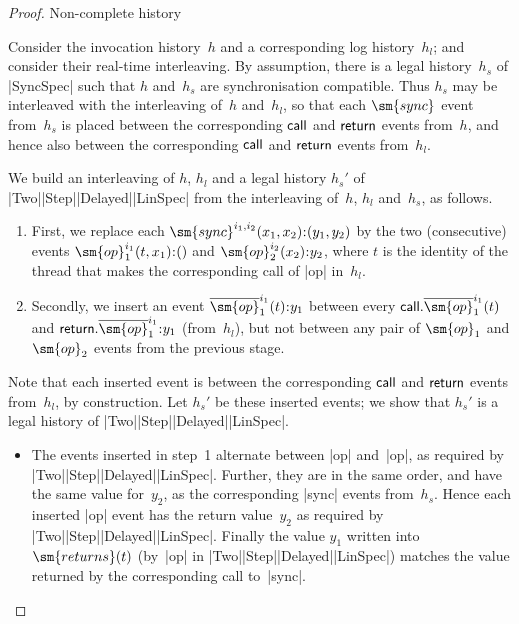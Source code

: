 \begin{proof}
\framebox{**} Non-complete history

Consider the invocation history~$h$ and a corresponding log history~$h_l$; and
consider their real-time interleaving.  By assumption, there is a legal
history~$h_s$ of |SyncSpec| such that $h$ and~$h_s$ are synchronisation
compatible.  Thus $h_s$ may be interleaved with the interleaving of~$h$
and~$h_l$, so that each $\sm{sync}$ event from~$h_s$ is placed between the
corresponding $\mathsf{call}$ and $\mathsf{return}$ events from~$h$, and hence also between
the corresponding $\mathsf{call}$ and $\mathsf{return}$ events from~$h_l$.

We build an interleaving of $h$, $h_l$ and a legal history $h_s'$ of
|Two|\-|Step|\-|Delayed|\-|LinSpec| from the interleaving of~$h$, $h_l$
and~$h_s$, as follows.
%
\begin{enumerate}
\item First, we replace each $\sm{sync}^{i_1,i_2}(x_1,x_2) \:: (y_1,y_2)$ by
  the two (consecutive) events $\sm{op}_1^{i_1}(t,x_1) \:: ()$ and
  $\sm{op}_2^{i_2}(x_2) \:: y_2$, where $t$ is the identity of the thread that
  makes the corresponding call of |op| in~$h_l$.  

\item Secondly, we insert an event $\overline{\sm{op}}_1^{i_1}(t) \:: y_1$
  between every $\call.\overline{\sm{op}}_1^{i_1}(t)$ and
  $\return.\overline{\sm{op}}_1^{i_1} \:: y_1$ (from~$h_l$), but not between
  any pair of $\sm{op}_1$ and $\sm{op}_2$ events from the previous stage.
\end{enumerate}
%
Note that each inserted event is between the corresponding $\mathsf{call}$ and
$\mathsf{return}$ events from~$h_l$, by construction.  Let $h_s'$ be these inserted
events; we show that $h_s'$ is a legal history of
|Two|\-|Step|\-|Delayed|\-|LinSpec|.  
\begin{itemize}
\item The events inserted in step~1 alternate between |op| and~|op|, as
  required by |Two|\-|Step|\-|Delayed|\-|LinSpec|.  Further, they are in the
  same order, and have the same value for~$y_2$, as the corresponding |sync|
  events from~$h_s$.  Hence each inserted |op| event has the return
  value~$y_2$ as required by |Two|\-|Step|\-|Delayed|\-|LinSpec|.  Finally the
  value $y_1$ written into $\sm{returns}(t)$ (by~|op| in
  |Two|\-|Step|\-|Delayed|\-|LinSpec|) matches the value returned by the
  corresponding call to~|sync|.


\end{itemize}
\end{proof}
